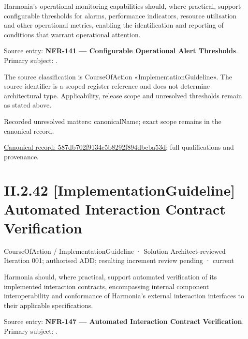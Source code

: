 Harmonia's operational monitoring capabilities should, where practical, support configurable thresholds for alarms, performance indicators, resource utilisation and other operational metrics, enabling the identification and reporting of conditions that warrant operational attention.



Source entry: \textbf{NFR-141 — Configurable Operational Alert Thresholds}. Primary subject: \texttt{}.



The source classification is CourseOfAction «ImplementationGuideline». The source identifier is a scoped register reference and does not determine architectural type. Applicability, release scope and unresolved thresholds remain as stated above.


{\small Recorded unresolved matters: canonicalName; exact scope remains in the canonical record.}\par
{\footnotesize \href{../../../../continuum/strategy/course-of-action/implementation-guideline/587db702f9134c5b8292f894dbcba53d.md}{Canonical record: 587db702f9134c5b8292f894dbcba53d}; full qualifications and provenance.}\par
\section*{II.2.42 [ImplementationGuideline] Automated Interaction Contract Verification}
\label{navigation:II.2.42}

\label{element:a6c8cc8f5647461cb210f88ced90cc57}
{\small CourseOfAction / ImplementationGuideline · Solution Architect-reviewed Iteration 001; authorised ADD; resulting increment review pending · current}\par

Harmonia should, where practical, support automated verification of its implemented interaction contracts, encompassing internal component interoperability and conformance of Harmonia's external interaction interfaces to their applicable specifications.



Source entry: \textbf{NFR-147 — Automated Interaction Contract Verification}. Primary subject: \texttt{}.



